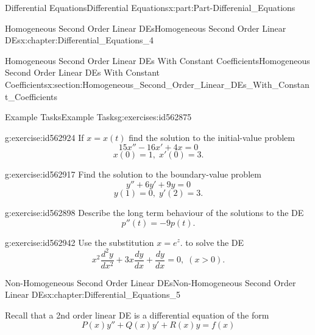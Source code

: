 \documentclass[oneside,10pt,]{book}
\numberwithin{equation}{section}
\begin{document}
\begin{partptx}{Differential Equations}{}{Differential Equations}{}{}{x:part:Part-Differenial_Equations}
\begin{chapterptx}{Homogeneous Second Order Linear DEs}{}{Homogeneous Second Order Linear DEs}{}{}{x:chapter:Differential_Equations_4}
\begin{sectionptx}{Homogeneous Second Order Linear DEs With Constant Coefficients}{}{Homogeneous Second Order Linear DEs With Constant Coefficients}{}{}{x:section:Homogeneous_Second_Order_Linear_DEs_With_Constant_Coefficients}
\begin{exercises-subsection-numberless}{Example Tasks}{}{Example Tasks}{}{}{g:exercises:id562875}
\begin{divisionexercise}{1}{}{}{g:exercise:id562924}
If \(x=x(t) \) find the solution to the initial-value problem%
\begin{equation*}
15x''-16x'+4x=0 
\end{equation*}
%
\begin{equation*}
x(0)=1,\; x'(0)=3. 
\end{equation*}
%
\end{divisionexercise}%
\begin{divisionexercise}{2}{}{}{g:exercise:id562917}%
Find the solution to the boundary-value problem%
\begin{equation*}
y''+6y'+9y=0 
\end{equation*}
%
\begin{equation*}
y(1)=0,\; y'(2)=3. 
\end{equation*}
%
\end{divisionexercise}%
\begin{divisionexercise}{3}{}{}{g:exercise:id562898}%
Describe the long term behaviour of the solutions to the DE%
\begin{equation*}
p''(t)=-9p(t).
\end{equation*}
%
\end{divisionexercise}%
\begin{divisionexercise}{4}{}{}{g:exercise:id562942}%
Use the substitution  \(x=e^{z}. \) to solve the DE%
%
\begin{equation*}
x^{2}\frac{d^{2}y}{dx^{2}} + 3x\frac{dy}{dx} + \frac{dy}{dx} = 0,\; (x > 0).
\end{equation*}
\end{divisionexercise}%
\end{exercises-subsection-numberless}
\end{sectionptx}
\end{chapterptx}
%
\typeout{************************************************}
\typeout{************************************************}
%
\begin{chapterptx}{Non-Homogeneous Second Order Linear DEs}{}{Non-Homogeneous Second Order Linear DEs}{}{}{x:chapter:Differential_Equations_5}
\begin{introduction}{}%
Recall that a 2nd order linear DE is a differential equation of the form%
\begin{equation*}
P(x)y''+Q(x)y'+R(x)y=f(x)
\end{equation*}

\end{introduction}
\end{chapterptx}
\end{partptx}
\end{document}
